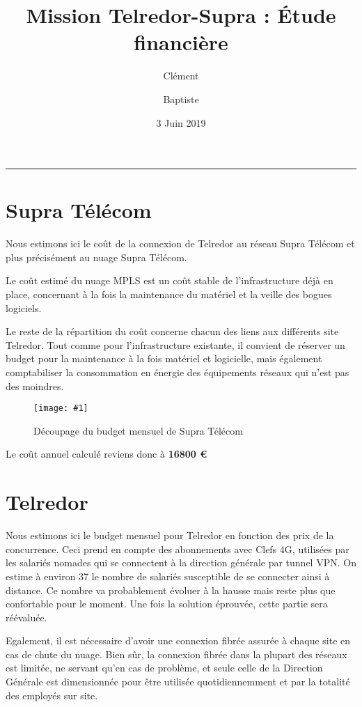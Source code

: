 \documentclass{article}
\title{Mission Telredor-Supra : Étude financière}
\date{3 Juin 2019}
\author{Clément \bsc{Boutin} \and Baptiste \bsc{Saclier}}
\newenvironment{figue}[1]{
	\par
	\bigskip
	\begin{figure}[h]
	\begin{center}
	  \texttt{[image: \#1]}
	\end{center}
}{
	\end{figure}
	\bigskip
}
\newcommand{\tlr}{Telredor\xspace}
\newcommand{\spr}{Supra Télécom\xspace}
\begin{document}
\maketitle

\begin{center}
\rule{0.5\textwidth}{0.4pt}
\end{center}

\tableofcontents

	\clearpage

	\section{\spr}

	Nous estimons ici le coût de la connexion de \tlr au réseau \spr et plus précisément au nuage \spr .

	Le coût estimé du nuage MPLS est un coût stable de l'infrastructure déjà en place, concernant à la fois la maintenance du matériel et la veille des bogues logiciels.

	Le reste de la répartition du coût concerne chacun des liens aux différents site \tlr .
	Tout comme pour l'infrastructure existante, il convient de réserver un budget pour la maintenance à la fois matériel et logicielle, mais également comptabiliser la consommation en énergie des équipements réseaux qui n'est pas des moindres.

	\begin{figue}{img/supra-telecom.png}
		\caption{Découpage du budget mensuel de \spr}
	\end{figue}
	
	Le coût annuel calculé reviens donc à \textbf{16800 \euro}

	\clearpage

	\section{\tlr}

	Nous estimons ici le budget mensuel pour Telredor en fonction des prix de la concurrence.
	Ceci prend en compte des abonnements avec Clefs 4G, utilisées par les salariés nomades qui se connectent à la direction générale par tunnel VPN.
	On estime à environ 37 le nombre de salariés susceptible de se connecter ainsi à distance.
	Ce nombre va probablement évoluer à la hausse mais reste plus que confortable pour le moment.
	Une fois la solution éprouvée, cette partie sera réévaluée.
	
	Egalement, il est nécessaire d'avoir une connexion fibrée assurée à chaque site en cas de chute du nuage.
	Bien sûr, la connexion fibrée dans la plupart des réseaux est limitée, ne servant qu'en cas de problème, et seule celle de la Direction Générale est dimensionnée pour être utilisée quotidiennemment et par la totalité des employés sur site.
\end{document}

